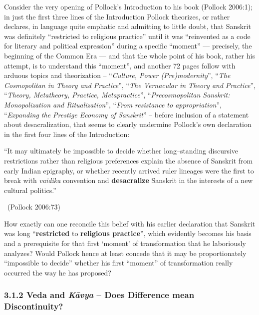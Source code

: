 Consider the very opening of Pollock’s Introduction to his book (Pollock 2006:1); in just the first three lines of the Introduction Pollock theorizes, or rather declares, in language quite emphatic and admitting to little doubt, that Sanskrit was definitely “restricted to religious practice” until it was “reinvented as a code for literary and political expression” during a specific “moment” — precisely, the beginning of the Common Era — and that the whole point of his book, rather his attempt, is to understand this “moment”, and another 72 pages follow with arduous topics and theorization – “\textit{Culture, Power (Pre)modernity}”, “\textit{The Cosmopolitan in Theory and Practice}”, “\textit{The Vernacular in Theory and Practice}”, “\textit{Theory, Metatheory, Practice, Metapractice}”, “\textit{Precosmopolitan Sanskrit: Monopolization and Ritualization}”, “\textit{From resistance to appropriation}”, “\textit{Expanding the Prestige Economy of Sanskrit}” – before inclusion of a statement about desacralization, that seems to clearly undermine Pollock’s own declaration in the first four lines of the Introduction:

\begin{myquote}
“It may ultimately be impossible to decide whether long–standing discursive restrictions rather than religious preferences explain the absence of Sanskrit from early Indian epigraphy, or whether recently arrived ruler lineages were the first to break with \textit{vaidika} convention and \textbf{desacralize} Sanskrit in the interests of a new cultural politics.” 

~\hfill (Pollock 2006:73)
\end{myquote}

How exactly can one reconcile this belief with his earlier declaration that Sanskrit was long “\textbf{restricted} to \textbf{religious practice}”, which evidently becomes his basis and a prerequisite for that first ‘moment’ of transformation that he laboriously analyzes? Would Pollock hence at least concede that it may be proportionately “impossible to decide” whether his first “moment” of transformation really occurred the way he has proposed?


\subsubsection*{3.1.2 Veda and \textit{Kāvya} – Does Difference mean Discontinuity?}

